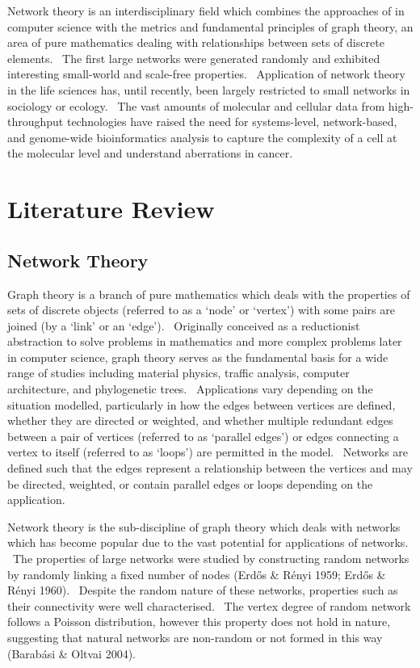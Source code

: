 Network theory is an interdisciplinary field which combines the
approaches of in computer science with the metrics and fundamental
principles of graph theory, an area of pure mathematics dealing with
relationships between sets of discrete elements. \ The first large
networks were generated randomly and exhibited interesting small-world
and scale-free properties. \ Application of network theory in the life
sciences has, until recently, been largely restricted to small networks
in sociology or ecology. \ The vast amounts of molecular and cellular
data from high-throughput technologies have raised the need for
systems-level, network-based, and genome-wide bioinformatics analysis
to capture the complexity of a cell at the molecular level and
understand aberrations in cancer. 



\section{Literature Review}
\subsection{Network Theory}

Graph theory is a branch of pure
mathematics which deals with the properties of sets of discrete objects
(referred to as a {\textquoteleft}node{\textquoteright} or
{\textquoteleft}vertex{\textquoteright}) with some pairs are joined (by
a {\textquoteleft}link{\textquoteright} or an
{\textquoteleft}edge{\textquoteright}). \ Originally conceived as a
reductionist abstraction to solve problems in mathematics and more
complex problems later in computer science, graph theory serves as the
fundamental basis for a wide range of studies including material
physics, traffic analysis, computer architecture, and phylogenetic
trees. \ Applications vary depending on the situation modelled,
particularly in how the edges between vertices are defined, whether
they are directed or weighted, and whether multiple redundant edges
between a pair of vertices (referred to as {\textquoteleft}parallel
edges{\textquoteright}) or edges connecting a vertex to itself
(referred to as {\textquoteleft}loops{\textquoteright}) are permitted
in the model. \ Networks are defined such that the edges represent a
relationship between the vertices and may be directed, weighted, or
contain parallel edges or loops depending on the application. \ 


Network theory is the sub-discipline of graph theory which deals with
networks which has become popular due to the vast potential for
applications of networks. \ The properties of large networks were
studied by constructing random networks by randomly linking a fixed
number of nodes (Erd\H{o}s \& R\'enyi 1959; Erd\H{o}s \& R\'enyi 1960).
\ Despite the random nature of these networks, properties such as their
connectivity were well characterised. \ The vertex degree of random
network follows a Poisson distribution, however this property does not
hold in nature, suggesting that natural networks are non-random or not
formed in this way (Barab\'asi \& Oltvai 2004). \ 


